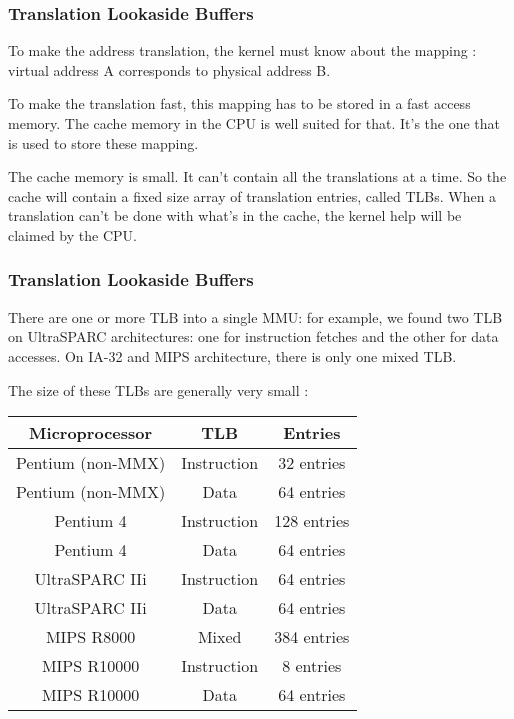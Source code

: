 
\begin{frame}
  \frametitle{Translation Lookaside Buffers}

  To make the address translation, the kernel must know about the mapping : virtual address A corresponds to physical address B.

  \-

  To make the translation fast, this mapping has to be stored in a fast access memory. The cache memory in the CPU is well suited for that. It's the one that is used to store these mapping.

  \-

  The cache memory is small. It can't contain all the translations at a time. So the cache will contain a fixed size array of translation entries, called TLBs. When a translation can't be done with what's in the cache, the kernel help will be claimed by the CPU.

\end{frame}

\begin{frame}
  \frametitle{Translation Lookaside Buffers}

  There are one or more TLB into a single MMU: for example, we
  found two TLB on UltraSPARC architectures: one for instruction
  fetches and the other for data accesses. On IA-32 and MIPS
  architecture, there is only one mixed TLB.

  \-

  The size of these TLBs are generally very small :
  \begin{center}
  \begin{tabular}{|c|c|c|}
    \hline
    Microprocessor & TLB & Entries \\
    \hline
    Pentium (non-MMX) & Instruction & 32 entries \\
    \hline
    Pentium (non-MMX) & Data & 64 entries \\
    \hline
    Pentium 4 & Instruction & 128 entries \\
    \hline
    Pentium 4 & Data & 64 entries \\
    \hline
    UltraSPARC IIi & Instruction & 64 entries \\
    \hline
    UltraSPARC IIi & Data & 64 entries \\
    \hline
    MIPS R8000 & Mixed & 384 entries \\
    \hline
    MIPS R10000 & Instruction & 8 entries \\
    \hline
    MIPS R10000 & Data & 64 entries \\
    \hline
  \end{tabular}
  \end{center}

\end{frame}

